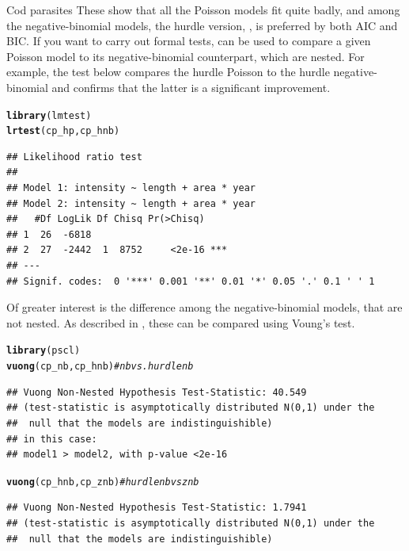 \documentclass[11pt]{book}\usepackage[]{graphicx}\usepackage[]{color}
\makeatletter
\newcommand{\hlcom}[1]{\textcolor[rgb]{0.678,0.584,0.686}{\textit{#1}}}%
\newcommand{\hlstd}[1]{\textcolor[rgb]{0.345,0.345,0.345}{#1}}%
\newcommand{\hlkwd}[1]{\textcolor[rgb]{0.737,0.353,0.396}{\textbf{#1}}}%
\newenvironment{kframe}{%
 \def\at@end@of@kframe{}%
 \ifinner\ifhmode%
  \def\at@end@of@kframe{\end{minipage}}%
  \begin{minipage}{\columnwidth}%
 \fi\fi%
 \def\FrameCommand##1{\hskip\@totalleftmargin \hskip-\fboxsep
 \colorbox{shadecolor}{##1}\hskip-\fboxsep
     \hskip-\linewidth \hskip-\@totalleftmargin \hskip\columnwidth}%
 \MakeFramed {\advance\hsize-\width
   \@totalleftmargin\z@ \linewidth\hsize
   \@setminipage}}%
 {\par\unskip\endMakeFramed%
 \at@end@of@kframe}
\newenvironment{knitrout}{}{} %
\renewenvironment{knitrout}{\small\renewcommand{\baselinestretch}{.85}}{} %
\makeatother
\begin{document}
\begin{Example}[cod2]{Cod parasites}
These show that all the Poisson models fit quite badly, and among the negative-binomial models,
the hurdle version, , is preferred by both AIC and BIC.
If you want to carry out formal tests,  can be used to compare
a given Poisson model to its negative-binomial counterpart, which are nested.
For example, the test below compares the hurdle Poisson to the hurdle
negative-binomial and confirms that the latter is a significant improvement.
\begin{knitrout}
\color{fgcolor}\begin{kframe}
\begin{alltt}
\hlkwd{library}\hlstd{(lmtest)}
\hlkwd{lrtest}\hlstd{(cp_hp, cp_hnb)}
\end{alltt}
\begin{verbatim}
## Likelihood ratio test
## 
## Model 1: intensity ~ length + area * year
## Model 2: intensity ~ length + area * year
##   #Df LogLik Df Chisq Pr(>Chisq)    
## 1  26  -6818                        
## 2  27  -2442  1  8752     <2e-16 ***
## ---
## Signif. codes:  0 '***' 0.001 '**' 0.01 '*' 0.05 '.' 0.1 ' ' 1
\end{verbatim}
\end{kframe}
\end{knitrout}
Of greater interest is the difference among the negative-binomial models,
that are not nested.  As described in ,
these can be compared using Voung's test.
\begin{knitrout}
\color{fgcolor}\begin{kframe}
\begin{alltt}
\hlkwd{library}\hlstd{(pscl)}
\hlkwd{vuong}\hlstd{(cp_nb, cp_hnb)}     \hlcom{# nb vs. hurdle nb}
\end{alltt}
\begin{verbatim}
## Vuong Non-Nested Hypothesis Test-Statistic: 40.549 
## (test-statistic is asymptotically distributed N(0,1) under the
##  null that the models are indistinguishible)
## in this case:
## model1 > model2, with p-value <2e-16
\end{verbatim}
\begin{alltt}
\hlkwd{vuong}\hlstd{(cp_hnb, cp_znb)}    \hlcom{# hurdle nb vs znb}
\end{alltt}
\begin{verbatim}
## Vuong Non-Nested Hypothesis Test-Statistic: 1.7941 
## (test-statistic is asymptotically distributed N(0,1) under the
##  null that the models are indistinguishible)

\end{verbatim}
\end{kframe}
\end{knitrout}
\end{Example}
\end{document}
